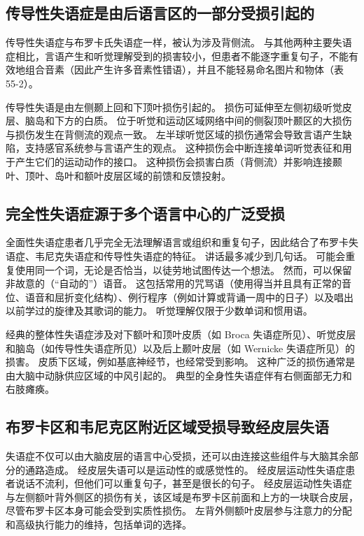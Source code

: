 \subsection{传导性失语症是由后语言区的一部分受损引起的}
传导性失语症与布罗卡氏失语症一样，被认为涉及背侧流。 与其他两种主要失语症相比，言语产生和听觉理解受到的损害较小，但患者不能逐字重复句子，不能有效地组合音素（因此产生许多音素性错语），并且不能轻易命名图片和物体（表 55-2）。

传导性失语是由左侧颞上回和下顶叶损伤引起的。 损伤可延伸至左侧初级听觉皮层、脑岛和下方的白质。 位于听觉和运动区域网络中间的侧裂顶叶颞区的大损伤与损伤发生在背侧流的观点一致。 左半球听觉区域的损伤通常会导致言语产生缺陷，支持感官系统参与言语产生的观点。 这种损伤会中断连接单词听觉表征和用于产生它们的运动动作的接口。 这种损伤会损害白质（背侧流）并影响连接颞叶、顶叶、岛叶和额叶皮层区域的前馈和反馈投射。

\subsection{完全性失语症源于多个语言中心的广泛受损}
全面性失语症患者几乎完全无法理解语言或组织和重复句子，因此结合了布罗卡失语症、韦尼克失语症和传导性失语症的特征。 讲话最多减少到几句话。 可能会重复使用同一个词，无论是否恰当，以徒劳地试图传达一个想法。 然而，可以保留非故意的（“自动的”）语音。 这包括常用的咒骂语（使用得当并且具有正常的音位、语音和屈折变化结构）、例行程序（例如计算或背诵一周中的日子）以及唱出以前学过的旋律及其歌词的能力。 听觉理解仅限于少数单词和惯用语。

经典的整体性失语症涉及对下额叶和顶叶皮质（如 Broca 失语症所见）、听觉皮层和脑岛（如传导性失语症所见）以及后上颞叶皮层（如 Wernicke 失语症所见）的损害。 皮质下区域，例如基底神经节，也经常受到影响。 这种广泛的损伤通常是由大脑中动脉供应区域的中风引起的。 典型的全身性失语症伴有右侧面部无力和右肢瘫痪。

\subsection{布罗卡区和韦尼克区附近区域受损导致经皮层失语}

失语症不仅可以由大脑皮层的语言中心受损，还可以由连接这些组件与大脑其余部分的通路造成。 经皮层失语可以是运动性的或感觉性的。 经皮层运动性失语症患者说话不流利，但他们可以重复句子，甚至是很长的句子。 经皮层运动性失语症与左侧额叶背外侧区的损伤有关，该区域是布罗卡区前面和上方的一块联合皮层，尽管布罗卡区本身可能会受到实质性损伤。 左背外侧额叶皮层参与注意力的分配和高级执行能力的维持，包括单词的选择。

